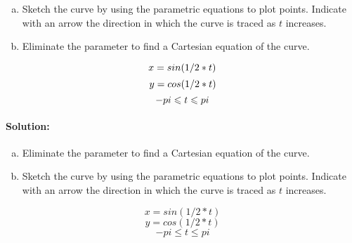 \documentclass[12pt]{article}
\newenvironment{problem}[2][Problem]{\begin{trivlist}
   \item[\hskip \labelsep {\bfseries #1}\hskip \labelsep {\bfseries #2.}]}{\end{trivlist}}
\newenvironment{solution}{\paragraph{Solution:}}{\hfill}
\newcommand{\pgraph}[4]{
       \begin{center}

       \begin{tikzpicture}
       \begin{axis}[
           trig format plots=rad,
           axis equal,
           grid=both
       ]
       \addplot [domain=#3:#4, variable=\t, samples=50, black, decoration={
           markings,
           mark=between positions 0.2 and 1 step 4em with {\arrow [scale=1.5]{stealth}}
           }, postaction=decorate]
       ({#1}, {#2});

       \end{axis}
       \end{tikzpicture}

       \end{center}
   }
\begin{document}
   \begin{problem}{10.1.7}

   \begin{enumerate}[(a)]
   \item Sketch the curve by using the parametric equations to plot points. Indicate with an arrow the direction in which the curve is traced as $t$ increases.
   \item Eliminate the parameter to find a Cartesian equation of the curve.
   \end{enumerate}

   \[ 	x = \xt \]
   \[	y = \yt \]
   \[	\dl \leqslant t \leqslant \dr \]
   \end{problem}

   \begin{solution}


   \end{solution}




   \newpage
   \def \xt {sin(1/2*t)}
   \def \yt {cos(1/2*t)}
   \def \dl {-pi}
   \def \dr {pi}

   \begin{problem}{10.1.11}

   \begin{enumerate}[(a)]
   \item Eliminate the parameter to find a Cartesian equation of the curve.
   \item Sketch the curve by using the parametric equations to plot points. Indicate with an arrow the direction in which the curve is traced as $t$ increases.
   \end{enumerate}

   \[ 	x = \xt \]
   \[	y = \yt \]
   \[	\dl \leqslant t \leqslant \dr \]
   \end{problem}
\end{document}
